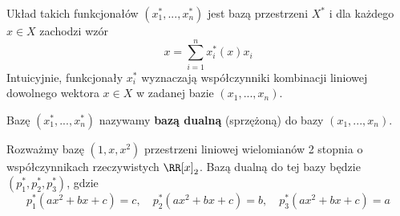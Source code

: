 Układ takich funkcjonałów $(x_1^*, ..., x_n^*)$ jest bazą przestrzeni $X^*$ i dla każdego $x \in X$ zachodzi wzór
$$x = \sum_{i = 1}^{n} x_i^*(x) x_i$$
Intuicyjnie, funkcjonały $x_i^*$ wyznaczają współczynniki kombinacji liniowej dowolnego wektora $x \in X$ w zadanej bazie $(x_1, ..., x_n)$.

Bazę $(x_1^*, ..., x_n^*)$ nazywamy \textbf{bazą dualną} (sprzężoną) do bazy $(x_1, ..., x_n)$.

\begin{example}
    Rozważmy bazę $(1, x, x^2)$ przestrzeni liniowej wielomianów 2 stopnia o współczynnikach rzeczywistych $\RR[x]_2$. Bazą dualną do tej bazy będzie $(p_1^*, p_2^*, p_3^*)$, gdzie
    $$p_1^*(ax^2 + bx + c) = c, \quad p_2^*(ax^2 + bx + c) = b, \quad p_3^*(ax^2 + bx + c) = a$$
\end{example}

